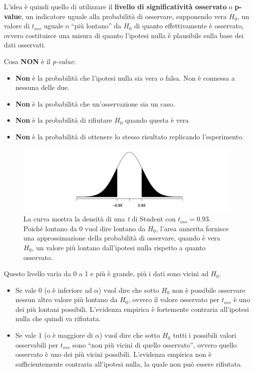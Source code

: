 L'idea è quindi quello di utilizzare il \textbf{livello di significatività osservato} o \textbf{p-value}, un indicatore uguale alla probabilità di osservare, supponendo vera $ H_0 $, un valore di $ t_{oss} $ uguale o ``più lontano'' da $ H_0 $ di quanto effettivamente è osservato, ovvero costituisce una misura di quanto l'ipotesi nulla è plausibile sulla base dei dati osservati.

Cosa \textbf{NON} è il \textit{p-value}:
\begin{itemize}
	\item \textbf{Non} è la probabilità che l'ipotesi nulla sia vera o falsa. Non è connessa a nessuna delle due.
	\item \textbf{Non} è la probabilità che un'osservazione sia un caso.
	\item \textbf{Non} è la probabilità di rifiutare $ H_0 $ quando questa è vera
	\item \textbf{Non} è la probabilità di ottenere lo stesso risultato replicando l'esperimento.
\end{itemize}


\begin{figure}[htbp]
\centering
\includegraphics[width=.9\textwidth]{./notes/immagini/l6-fig7.png}
\caption{La curva mostra la densità di una \textit{t} di Student con $ t_{oss} = 0.93 $. Poiché lontano da 0 vuol dire lontano da $ H_0 $, l'area annerita fornisce una approssimazione della probabilità di osservare, quando è vera $ H_0 $, un valore più lontano dall'ipotesi nulla rispetto a quanto osservato.}
\end{figure}


Questo livello varia da 0 a 1 e più è grande, più i dati sono vicini ad $ H_0 $.

\begin{itemize}
\item
  Se vale 0 (o è inferiore ad $ \alpha $) vuol dire che sotto $ H_0 $ non è possibile osservare nessun
  altro valore più lontano da $ H_0 $, ovvero il valore osservato per $ t_{oss} $
  è uno dei più lontani possibili. L'evidenza empirica è fortemente contraria all'ipotesi nulla che quindi va rifiutata.
\item
  Se vale 1 (o è maggiore di $ \alpha $) vuol dire che sotto $ H_0 $ tutti i possibili valori osservabili
  per $ t_{oss} $ sono ``non più vicini di quello osservato'', ovvero quello
  osservato è uno dei più vicini possibili. L'evidenza empirica non è sufficientemente contraria all'ipotesi nulla, la quale non può essere rifiutata.
\end{itemize}

